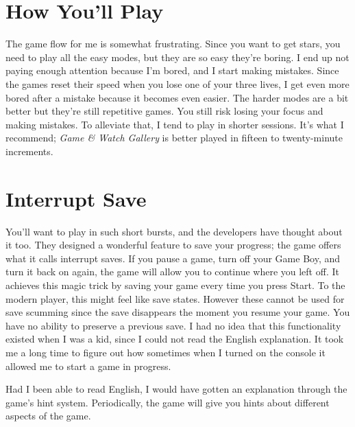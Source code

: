 \documentclass{book}
\let\oldcenter\center
\let\oldendcenter\endcenter
\renewenvironment{center}{\setlength\topsep{0pt}\oldcenter}{\oldendcenter}
\begin{document}
\FloatBarrier\needspace{10mm}\section*{How You’ll Play}\nopagebreak[4]

The game flow for me is somewhat frustrating. Since you want to get stars, you need to play all the easy modes, but they are so easy they’re boring. I end up not paying enough attention because I’m bored, and I start making mistakes. Since the games reset their speed when you lose one of your three lives, I get even more bored after a mistake because it becomes even easier. The harder modes are a bit better but they’re still repetitive games. You still risk losing your focus and making mistakes. To alleviate that, I tend to play in shorter sessions. It’s what I recommend; \emph{Game \& Watch Gallery} is better played in fifteen to twenty-minute increments.

\FloatBarrier\needspace{10mm}\section*{Interrupt Save}\nopagebreak[4]

\begin{center}
\vspace{8pt}
\quad\vspace{4pt}
\end{center}

You’ll want to play in such short bursts, and the developers have thought about it too. They designed a wonderful feature to save your progress; the game offers what it calls interrupt saves. If you pause a game, turn off your Game Boy, and turn it back on again, the game will allow you to continue where you left off. It achieves this magic trick by saving your game every time you press Start. To the modern player, this might feel like save states. However these cannot be used for save scumming since the save disappears the moment you resume your game. You have no ability to preserve a previous save. I had no idea that this functionality existed when I was a kid, since I could not read the English explanation. It took me a long time to figure out how sometimes when I turned on the console it allowed me to start a game in progress.

Had I been able to read English, I would have gotten an explanation through the game’s hint system. Periodically, the game will give you hints about different aspects of the game.
\end{document}

